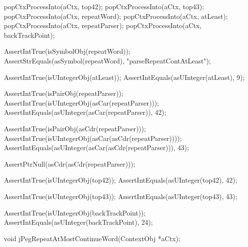   popCtxProcessInto(aCtx, top42);
  popCtxProcessInto(aCtx, top43);
  popCtxProcessInto(aCtx, repeatWord);
  popCtxProcessInto(aCtx, atLeast);
  popCtxProcessInto(aCtx, repeatParser);
  popCtxProcessInto(aCtx, backTrackPoint);
  
  AssertIntTrue(isSymbolObj(repeatWord));
  AssertStrEquals(asSymbol(repeatWord), "parseRepeatContAtLeast");
  
  AssertIntTrue(isUIntegerObj(atLeast));
  AssertIntEquals(asUInteger(atLeast), 9);
  
  AssertIntTrue(isPairObj(repeatParser));
  AssertIntTrue(isUIntegerObj(asCar(repeatParser)));
  AssertIntEquals(asUInteger(asCar(repeatParser)), 42);
  
  AssertIntTrue(isPairObj(asCdr(repeatParser)));
  AssertIntTrue(isUIntegerObj(asCar(asCdr(repeatParser))));
  AssertIntEquals(asUInteger(asCar(asCdr(repeatParser))), 43);
  
  AssertPtrNull(asCdr(asCdr(repeatParser)));
  
  AssertIntTrue(isUIntegerObj(top42));
  AssertIntEquals(asUInteger(top42), 42);  

  AssertIntTrue(isUIntegerObj(top43));
  AssertIntEquals(asUInteger(top43), 43);
  
  AssertIntTrue(isUIntegerObj(backTrackPoint));
  AssertIntEquals(asUInteger(backTrackPoint), 24);
\stopCTest
\stopTestCase
\stopTestSuite

\startTestSuite[jPegRepeatAtMostContinueWord]

\startCHeader
void jPegRepeatAtMostContinueWord(ContextObj *aCtx);
\stopCHeader

